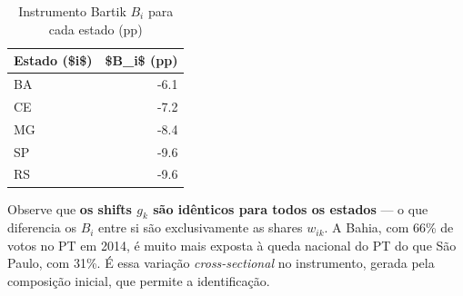 \documentclass[
]{article}
\newenvironment{Shaded}{\begin{snugshade}}{\end{snugshade}}
\newcommand{\AttributeTok}[1]{\textcolor[rgb]{0.13,0.29,0.53}{#1}}
\newcommand{\ConstantTok}[1]{\textcolor[rgb]{0.56,0.35,0.01}{#1}}
\newcommand{\DecValTok}[1]{\textcolor[rgb]{0.00,0.00,0.81}{#1}}
\newcommand{\FunctionTok}[1]{\textcolor[rgb]{0.13,0.29,0.53}{\textbf{#1}}}
\newcommand{\NormalTok}[1]{#1}
\newcommand{\OtherTok}[1]{\textcolor[rgb]{0.56,0.35,0.01}{#1}}
\newcommand{\SpecialCharTok}[1]{\textcolor[rgb]{0.81,0.36,0.00}{\textbf{#1}}}
\newcommand{\StringTok}[1]{\textcolor[rgb]{0.31,0.60,0.02}{#1}}
\begin{document}
\begin{Shaded}
\end{Shaded}

\begin{table}

\caption{\label{tab:ss-iv-bartik}Instrumento Bartik $B_i$ para cada estado (pp)}
\centering
\begin{tabular}[t]{l|r}
\hline
Estado (\$i\$) & \$B\_i\$ (pp)\\
\hline
BA & -6.1\\
\hline
CE & -7.2\\
\hline
MG & -8.4\\
\hline
SP & -9.6\\
\hline
RS & -9.6\\
\hline
\end{tabular}
\end{table}

Observe que \textbf{os shifts \(g_k\) são idênticos para todos os estados} --- o que diferencia os \(B_i\) entre si são exclusivamente as shares \(w_{ik}\). A Bahia, com 66\% de votos no PT em 2014, é muito mais exposta à queda nacional do PT do que São Paulo, com 31\%. É essa variação \emph{cross-sectional} no instrumento, gerada pela composição inicial, que permite a identificação.
\end{document}
